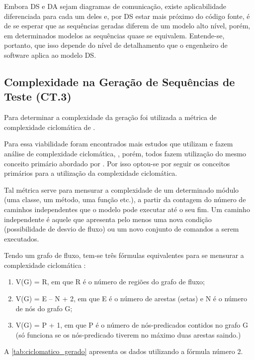 Embora DS e DA sejam diagramas de comunicação, existe aplicabilidade diferenciada para cada um deles e, por DS estar mais próximo do código fonte, é de se esperar que as sequências geradas diferem de um modelo alto nível, porém, em determinados modelos as sequências quase se equivalem. Entende-se, portanto, que isso depende do nível de detalhamento que o engenheiro de software aplica ao modelo DS.

\subsection{Complexidade na Geração de Sequências de Teste (CT.3)}
\label{cap4subsec:ciclomatico}
Para determinar a complexidade da geração foi utilizada a métrica de complexidade ciclomática de \citet{mccabe1976complexity}. 


Para essa viabilidade foram encontrados mais estudos que utilizam e fazem análise de complexidade ciclomática, \cite{jay2009cyclomatic,gill1991cyclomatic,shepperd1988critique}, porém, todos fazem utilização do mesmo conceito primário abordado por \citet{mccabe1976complexity}. Por isso optou-se por seguir os conceitos primários para a utilização da complexidade ciclomática. 

Tal métrica serve para mensurar a complexidade de um determinado módulo (uma classe, um método, uma função etc.), a partir da contagem do número de caminhos independentes que o modelo pode executar até o seu fim. Um caminho independente é aquele que apresenta pelo menos uma nova condição (possibilidade de desvio de fluxo) ou um novo conjunto de comandos a serem executados.


Tendo um grafo de fluxo, tem-se três fórmulas equivalentes para se mensurar a complexidade ciclomática  \citet{mccabe1976complexity}:
\begin{enumerate}
	\item V(G) = R, em que R é o número de regiões do grafo de fluxo;
	\item V(G) = E – N + 2, em que E é o número de arestas (setas) e N é o número de nós do grafo G;
	\item V(G) = P + 1, em que P é o número de nós-predicados contidos no grafo G (só funciona se os nós-predicado tiverem no máximo duas arestas saindo.)
\end{enumerate}

A \ref{tab:ciclomatico_gerado} apresenta os dados utilizando a fórmula número 2.

